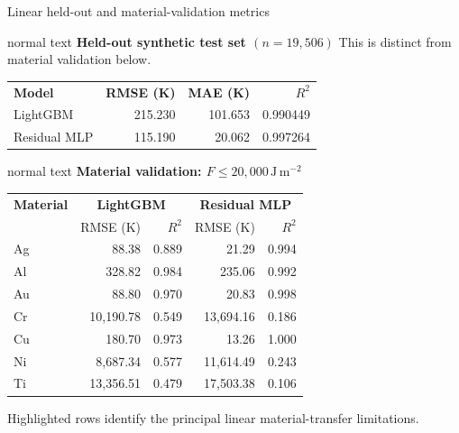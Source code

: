 \documentclass[aspectratio=169,10pt]{beamer}
\begin{document}
\begin{frame}[t]{Linear held-out and material-validation metrics}
  \hypertarget{supp:surrogates-linear-metrics}{}
  \vspace{-0.18cm}\hfill
  \hspace{0.10cm}\GVBackupIndexButton
  \vspace{0.03cm}
  \begin{beamercolorbox}[wd=0.92\textwidth,sep=0.42em]{normal text}
    \small\textbf{\color{GVCapacityPurple}Held-out synthetic test set \((n=19{,}506)\)}\hfill
    \scriptsize This is distinct from material validation below.\par
    \vspace{0.07cm}\centering\scriptsize
    \begin{tabular}{@{}lrrr@{}}
      \rowcolor{GVTealTint}\textbf{Model} & \textbf{RMSE (K)} & \textbf{MAE (K)} & \textbf{\(R^2\)}\\
      LightGBM & 215.230 & 101.653 & 0.990449\\
      Residual MLP & 115.190 & 20.062 & 0.997264
    \end{tabular}
  \end{beamercolorbox}
  \vspace{0.16cm}
  \begin{beamercolorbox}[wd=0.92\textwidth,sep=0.45em]{normal text}
    \small\textbf{\color{GVCouplingOrange}Material validation: \(F\leq20{,}000\,\mathrm{J\,m^{-2}}\)}\par
    \vspace{0.07cm}\centering\scriptsize
    \begin{tabular}{@{}lrrrr@{}}
      \rowcolor{GVTealTint}\textbf{Material} & \multicolumn{2}{c}{\textbf{LightGBM}} & \multicolumn{2}{c}{\textbf{Residual MLP}}\\
      \rowcolor{GVTealTint} & RMSE (K) & \(R^2\) & RMSE (K) & \(R^2\)\\
      Ag & 88.38 & 0.889 & 21.29 & 0.994\\
      Al & 328.82 & 0.984 & 235.06 & 0.992\\
      Au & 88.80 & 0.970 & 20.83 & 0.998\\
      \rowcolor{GVRedTint}Cr & 10,190.78 & 0.549 & 13,694.16 & 0.186\\
      Cu & 180.70 & 0.973 & 13.26 & 1.000\\
      \rowcolor{GVRedTint}Ni & 8,687.34 & 0.577 & 11,614.49 & 0.243\\
      \rowcolor{GVRedTint}Ti & 13,356.51 & 0.479 & 17,503.38 & 0.106
    \end{tabular}\par
    \vspace{0.07cm}\scriptsize\color{GVSlate}Highlighted rows identify the principal linear material-transfer limitations.
  \end{beamercolorbox}
\end{frame}
\end{document}
